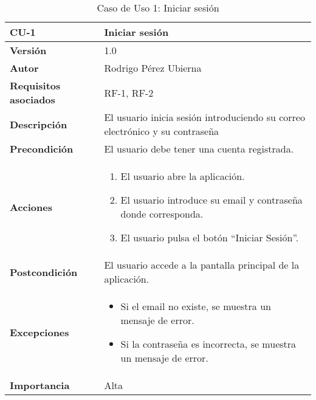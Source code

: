 \begin{table}[p]
	\centering
	\begin{tabularx}{\linewidth}{ p{} p{} }
		\toprule
		\textbf{CU-1} & \textbf{Iniciar sesión}\\
		\toprule
		\textbf{Versión} & 1.0 \\
		\textbf{Autor} & Rodrigo Pérez Ubierna \\
		\textbf{Requisitos asociados} & RF-1, RF-2 \\
		\textbf{Descripción} & El usuario inicia sesión introduciendo su correo electrónico y su contraseña \\
		\textbf{Precondición} & El usuario debe tener una cuenta registrada. \\
		\textbf{Acciones} &
		\begin{enumerate}
			\def\labelenumi{\arabic{enumi}.}
			\tightlist
			\item El usuario abre la aplicación.
			\item El usuario introduce su email y contraseña donde corresponda.
			\item El usuario pulsa el botón ``Iniciar Sesión''.
		\end{enumerate}\\
		\textbf{Postcondición} & El usuario accede a la pantalla principal de la aplicación. \\
		\textbf{Excepciones} & 
			\begin{itemize}
				\item Si el email no existe, se muestra un mensaje de error.
				\item Si la contraseña es incorrecta, se muestra un mensaje de error.
			\end{itemize} \\
		\textbf{Importancia} & Alta \\
		\bottomrule
	\end{tabularx}
	\caption{Caso de Uso 1: Iniciar sesión}
\end{table}

